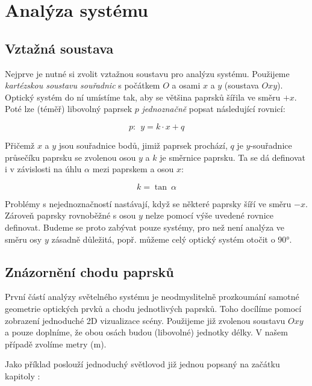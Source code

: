 \section{Analýza systému}

\subsection{Vztažná soustava}

Nejprve je nutné si zvolit vztažnou soustavu pro analýzu systému. Použijeme \emph{kartézskou soustavu souřadnic} s počátkem $O$ a osami $x$ a $y$ (soustava $Oxy$). Optický systém do ní umístíme tak, aby se většina paprsků šířila ve směru $+x$. Poté lze (téměř) libovolný paprsek $p$ \emph{jednoznačně} popsat následující rovnicí:

\[ p:\ \ y = k \cdot x + q \]

Přičemž $x$ a $y$ jsou souřadnice bodů, jimiž paprsek prochází, $q$ je $y$-souřadnice průsečíku paprsku se zvolenou osou $y$ a $k$ je směrnice paprsku. Ta se dá definovat i v závislosti na úhlu $\alpha$ mezi paprskem a osou $x$:

\[ k = \tan\ \alpha \]

Problémy s nejednoznačností nastávají, když se některé paprsky šíří ve směru $-x$. Zároveň paprsky rovnoběžné s osou $y$ nelze pomocí výše uvedené rovnice definovat. Budeme se proto zabývat pouze systémy, pro než není analýza ve směru osy $y$ zásadně důležitá, popř. můžeme celý optický systém otočit o 90°.


\subsection{Znázornění chodu paprsků}
První částí analýzy světelného systému je neodmyslitelně prozkoumání samotné geometrie optických prvků a chodu jednotlivých paprsků. Toho docílíme pomocí zobrazení jednoduché 2D vizualizace scény. Použijeme již zvolenou soustavu $Oxy$ a pouze doplníme, že obou osách budou (libovolné) jednotky délky. V našem případě zvolíme metry ($\mathrm{m}$).

Jako příklad poslouží jednoduchý světlovod již jednou popsaný na začátku kapitoly :



